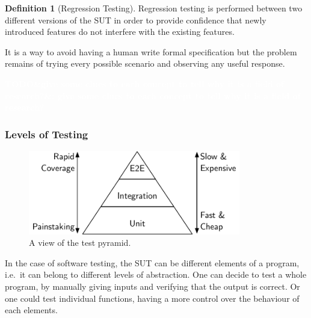 \documentclass[11pt]{sdm_internship}
\newcommand{\todo}[1]{\colorbox{Red!75}{\textcolor{white}{\textbf{TODO\ifx&#1&\else: #1\fi}}}}
\theoremstyle{definition}
\newtheorem{definition}{Definition}[section]
\begin{document}
\begin{definition}[Regression Testing]
  Regression testing is performed between two different versions of the SUT in order to provide confidence that newly introduced features do not interfere with the existing features.
\end{definition}

It is a way to avoid having a human write formal specification but the problem remains of trying every possible scenario and observing any useful response.

\todo{give some clues to each concept to tell why it is a field of research?}

\subsubsection{Levels of Testing}%
\label{sssec:levels_testing}
\begin{figure}
  \centering
  \includegraphics[width=25em]{test_pyramid}
  \caption{A view of the test pyramid.}%
  \label{fig:test_pyramid}
\end{figure}

In the case of software testing, the SUT can be different elements of a program, i.e.\ it can belong to different levels of abstraction.
One can decide to test a whole program, by manually giving inputs and verifying that the output is correct.
Or one could test individual functions, having a more control over the behaviour of each elements.
\end{document}
